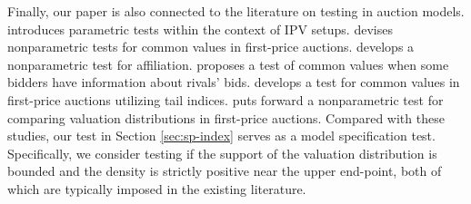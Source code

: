 Finally, our paper is also connected to the literature on testing in auction models. \citet{DonaldPaarsch1996} introduces parametric tests within the context of IPV setups. \citet{HaileHongShum2003} devises nonparametric tests for common values in first-price auctions. \citet{JunPinkseWan2010} develops a nonparametric test for affiliation. \citet{HortacsuKastl2012} proposes a test of common values when some bidders have information about rivals' bids. \citet{HillShneyerov2013} develops a test for common values in first-price auctions utilizing tail indices. \citet{LiuLuo2017} puts forward a nonparametric test for comparing valuation distributions in first-price auctions. 
Compared with these studies, our test in Section \ref{sec:sp-index} serves as a model specification test. Specifically, we consider testing if the support of the valuation distribution is bounded and the density is strictly positive near the upper end-point, both of which are typically imposed in the existing literature.



